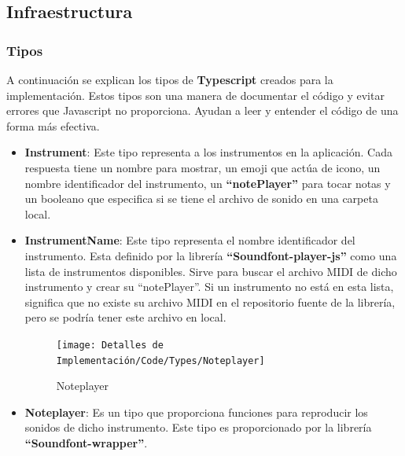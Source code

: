\documentclass[12pt,twoside,titlepage]{report}
\begin{document}
\subsection{Infraestructura}

\subsubsection{Tipos}

A continuación se explican los tipos de \textbf{Typescript} creados para la implementación. Estos tipos son una manera de documentar el código y evitar errores que Javascript no proporciona. Ayudan a leer y entender el código de una forma más efectiva.

\begin{itemize}
    \begin{figure}[H]
        \centering
        \texttt{[image: Detalles de Implementación/Code/Types/Instrument]}
        \label{fig:Instrument}
        \caption{Instrument}
    \end{figure}

    \item \textbf{Instrument}: Este tipo representa a los instrumentos en la aplicación. Cada respuesta tiene un nombre para mostrar, un emoji que actúa de icono, un nombre identificador del instrumento, un \textbf{``notePlayer''} para tocar notas y un booleano que especifica si se tiene el archivo de sonido en una carpeta local.
    \item \textbf{InstrumentName}: Este tipo representa el nombre identificador del instrumento. Esta definido por la librería \textbf{``Soundfont-player-js''} como una lista de instrumentos disponibles. Sirve para buscar el archivo MIDI de dicho instrumento y crear su ``notePlayer''. Si un instrumento no está en esta lista, significa que no existe su archivo MIDI en el repositorio fuente de la librería, pero se podría tener este archivo en local.
    
    \begin{figure}[H]
        \centering
        \texttt{[image: Detalles de Implementación/Code/Types/Noteplayer]}
        \label{fig:Noteplayer}
        \caption{Noteplayer}
    \end{figure}

    \item \textbf{Noteplayer}: Es un tipo que proporciona funciones para reproducir los sonidos de dicho instrumento. Este tipo es proporcionado por la librería \textbf{``Soundfont-wrapper''}.


\end{itemize}
\end{document}
